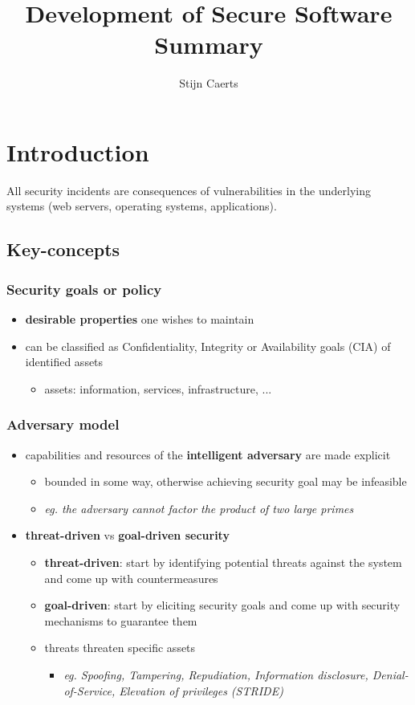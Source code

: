 \documentclass[12pt,titlepage,a4paper]{report}
\author{Stijn Caerts}
\title{Development of Secure Software\\\small{Summary}}
\begin{document}
	\maketitle
	\tableofcontents
	\newpage
	
	\chapter{Introduction}
	All security incidents are consequences of vulnerabilities in the underlying systems (web servers, operating systems, applications).
	
	\section{Key-concepts}
	\subsection{Security goals or policy}
	\begin{itemize}
		\item \textbf{desirable properties} one wishes to maintain
		\item can be classified as Confidentiality, Integrity or Availability goals (CIA) of identified assets
		\begin{itemize}
			\item assets: information, services, infrastructure, ...
		\end{itemize}
	\end{itemize}

	\subsection{Adversary model}
	\begin{itemize}
		\item capabilities and resources of the \textbf{intelligent adversary} are made explicit
		\begin{itemize}
			\item bounded in some way, otherwise achieving security goal may be infeasible
			\item \emph{eg. the adversary cannot factor the product of two large primes}
		\end{itemize}
		\item \textbf{threat-driven} vs \textbf{goal-driven security}
		\begin{itemize}
			\item \textbf{threat-driven}: start by identifying potential threats against the system and come up with countermeasures
			\item \textbf{goal-driven}: start by eliciting security goals and come up with security mechanisms to guarantee them
			\item threats threaten specific assets
			\begin{itemize}
				\item \emph{eg. Spoofing, Tampering, Repudiation, Information disclosure, Denial-of-Service, Elevation of privileges (STRIDE)}
			\end{itemize}
		\end{itemize}
	\end{itemize}
\end{document}
